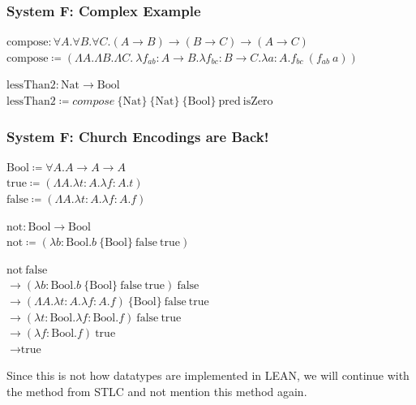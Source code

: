 \documentclass{beamer}
\newcommand{\bool}{\text{Bool}}
\newcommand{\nat}{\text{Nat}}
\newcommand{\true}{\text{true}}
\newcommand{\false}{\text{false}}
\begin{document}
\begin{frame}[fragile]
  \frametitle{System F: Complex Example}

  $\text{compose} : \forall A . \forall B . \forall C . (A \rightarrow B) \rightarrow (B \rightarrow C) \rightarrow (A \rightarrow C)$ \\
  $\text{compose} \coloneqq (\Lambda A . \Lambda B . \Lambda C . \ \lambda f_{ab} : A \rightarrow B . \lambda f_{bc} : B \rightarrow C . \lambda a: A . f_{bc}\ (f_{ab}\ a))$ \\

  \vspace{5mm}

  $\text{lessThan2} : \nat \rightarrow \bool$ \\
  $\text{lessThan2} \coloneqq compose\ \{\nat\}\ \{\nat\}\ \{\bool\}\ \text{pred}\ \text{isZero}$

\end{frame}

\begin{frame}[fragile]
  \frametitle{System F: Church Encodings are Back!}

  $\bool \coloneqq \forall A . A \rightarrow A \rightarrow A$ \\
  $\true \coloneqq (\Lambda A . \lambda t : A . \lambda f : A . t)$ \\
  $\false \coloneqq (\Lambda A . \lambda t : A . \lambda f : A . f)$ \\

  \vspace{5mm}

  $\text{not} : \bool \rightarrow \bool$ \\
  $\text{not} \coloneqq (\lambda b : \bool . b\ \{\bool\}\ \false\ \true)$

  \vspace{5mm}

  $\text{not}\ \false$ \\
  $\rightarrow (\lambda b : \bool . b\ \{\bool\}\ \false\ \true)\ \false$ \\
  $\rightarrow (\Lambda A . \lambda t : A . \lambda f : A . f)\ \{\bool\}\ \false\ \true$ \\
  $\rightarrow (\lambda t : \bool . \lambda f : \bool . f)\ \false\ \true$ \\
  $\rightarrow (\lambda f : \bool . f)\ \true$ \\
  $\rightarrow \true$ \\

  \vspace{5mm}

  Since this is not how datatypes are implemented in LEAN, we will continue with the method from STLC and not mention this method again.
\end{frame}
\end{document}

